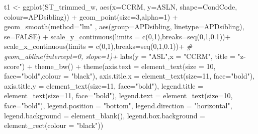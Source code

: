 \documentclass[a4paper, twoside]{templates/ociamthesis}
\newenvironment{Shaded}{\begin{snugshade}}{\end{snugshade}}
\newcommand{\AttributeTok}[1]{\textcolor[rgb]{0.77,0.63,0.00}{#1}}
\newcommand{\CommentTok}[1]{\textcolor[rgb]{0.56,0.35,0.01}{\textit{#1}}}
\newcommand{\ConstantTok}[1]{\textcolor[rgb]{0.00,0.00,0.00}{#1}}
\newcommand{\DecValTok}[1]{\textcolor[rgb]{0.00,0.00,0.81}{#1}}
\newcommand{\FloatTok}[1]{\textcolor[rgb]{0.00,0.00,0.81}{#1}}
\newcommand{\FunctionTok}[1]{\textcolor[rgb]{0.00,0.00,0.00}{#1}}
\newcommand{\NormalTok}[1]{#1}
\newcommand{\OtherTok}[1]{\textcolor[rgb]{0.56,0.35,0.01}{#1}}
\newcommand{\SpecialCharTok}[1]{\textcolor[rgb]{0.00,0.00,0.00}{#1}}
\newcommand{\StringTok}[1]{\textcolor[rgb]{0.31,0.60,0.02}{#1}}
\renewenvironment{Shaded}
{
  \vspace{4pt}%
  \begin{snugshade}%
}{%
  \end{snugshade}%
  \vspace{4pt}%
}
\begin{document}
\begin{Shaded}
\begin{Highlighting}[]
\NormalTok{t1 }\OtherTok{\textless{}{-}} \FunctionTok{ggplot}\NormalTok{(ST\_trimmed\_w, }\FunctionTok{aes}\NormalTok{(}\AttributeTok{x=}\NormalTok{CCRM, }\AttributeTok{y=}\NormalTok{ASLN, }\AttributeTok{shape=}\NormalTok{CondCode, }\AttributeTok{colour=}\NormalTok{APDsibling)) }\SpecialCharTok{+}
  \FunctionTok{geom\_point}\NormalTok{(}\AttributeTok{size=}\DecValTok{3}\NormalTok{,}\AttributeTok{alpha=}\DecValTok{1}\NormalTok{) }\SpecialCharTok{+}
  \FunctionTok{geom\_smooth}\NormalTok{(}\AttributeTok{method=}\StringTok{"lm"}\NormalTok{ , }\FunctionTok{aes}\NormalTok{(}\AttributeTok{group=}\NormalTok{APDsibling, }\AttributeTok{linetype=}\NormalTok{APDsibling), }\AttributeTok{se=}\ConstantTok{FALSE}\NormalTok{) }\SpecialCharTok{+}
  \FunctionTok{scale\_y\_continuous}\NormalTok{(}\AttributeTok{limits =} \FunctionTok{c}\NormalTok{(}\DecValTok{0}\NormalTok{,}\DecValTok{1}\NormalTok{),}\AttributeTok{breaks=}\FunctionTok{seq}\NormalTok{(}\DecValTok{0}\NormalTok{,}\DecValTok{1}\NormalTok{,}\FloatTok{0.1}\NormalTok{))}\SpecialCharTok{+}
  \FunctionTok{scale\_x\_continuous}\NormalTok{(}\AttributeTok{limits =} \FunctionTok{c}\NormalTok{(}\DecValTok{0}\NormalTok{,}\DecValTok{1}\NormalTok{),}\AttributeTok{breaks=}\FunctionTok{seq}\NormalTok{(}\DecValTok{0}\NormalTok{,}\DecValTok{1}\NormalTok{,}\FloatTok{0.1}\NormalTok{))}\SpecialCharTok{+}
  \CommentTok{\# geom\_abline(intercept=0, slope=1)+ }
  \FunctionTok{labs}\NormalTok{(}\AttributeTok{y =} \StringTok{"ASL"}\NormalTok{,}\AttributeTok{x =} \StringTok{"CCRM"}\NormalTok{, }\AttributeTok{title =} \StringTok{"z{-}score"}\NormalTok{) }\SpecialCharTok{+} 
  \FunctionTok{theme\_bw}\NormalTok{() }\SpecialCharTok{+}
  \FunctionTok{theme}\NormalTok{(}\AttributeTok{axis.text =} \FunctionTok{element\_text}\NormalTok{(}\AttributeTok{size =} \DecValTok{10}\NormalTok{, }\AttributeTok{face=}\StringTok{"bold"}\NormalTok{,}\AttributeTok{colour =} \StringTok{"black"}\NormalTok{),}
        \AttributeTok{axis.title.x =} \FunctionTok{element\_text}\NormalTok{(}\AttributeTok{size=}\DecValTok{11}\NormalTok{, }\AttributeTok{face=}\StringTok{"bold"}\NormalTok{),}
        \AttributeTok{axis.title.y =} \FunctionTok{element\_text}\NormalTok{(}\AttributeTok{size=}\DecValTok{11}\NormalTok{, }\AttributeTok{face=}\StringTok{"bold"}\NormalTok{),}
        \AttributeTok{legend.title =} \FunctionTok{element\_text}\NormalTok{(}\AttributeTok{size=}\DecValTok{11}\NormalTok{, }\AttributeTok{face=}\StringTok{"bold"}\NormalTok{),}
        \AttributeTok{legend.text  =} \FunctionTok{element\_text}\NormalTok{(}\AttributeTok{size=}\DecValTok{10}\NormalTok{, }\AttributeTok{face=}\StringTok{"bold"}\NormalTok{),}
        \AttributeTok{legend.position =} \StringTok{"bottom"}\NormalTok{,}
        \AttributeTok{legend.direction =} \StringTok{"horizontal"}\NormalTok{,}
        \AttributeTok{legend.background =} \FunctionTok{element\_blank}\NormalTok{(),}
        \AttributeTok{legend.box.background =} \FunctionTok{element\_rect}\NormalTok{(}\AttributeTok{colour =} \StringTok{"black"}\NormalTok{))}



\end{Highlighting}
\end{Shaded}
\end{document}
